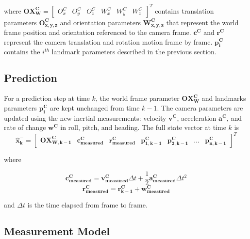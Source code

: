 \noindent where $\boldsymbol{OX_{W}^{C}}= \begin{bmatrix}O_{x}^{C} &
  O_{y}^{C} & O_{z}^{C} & W_{x}^{C} & W_{y}^{C} &
  W_{z}^{C} \end{bmatrix}^{T}$ contains translation parameters
$\boldsymbol{O_{x,y,z}^{C}}$ and orientation parameters
$\boldsymbol{W_{x,y,z}^{C}}$ that represent the world frame position and
orientation referenced to the camera frame.
$\boldsymbol{c^{C}}$ and $\boldsymbol{r^{C}}$ represent the camera
translation and rotation motion frame by frame. $\boldsymbol{p_{i}^{C}}$
contains the $i^{th}$ landmark parameters described in the previous section.

\subsection{Prediction}\label{sec:prediction}

For a prediction step at time $k$, the world frame parameter
$\boldsymbol{OX_W^C}$ and landmarks parameters $\boldsymbol{p_i^C}$
are kept unchanged from time $k-1$. The camera parameters are updated
using the new inertial measurements: velocity $\boldsymbol{v^{C}}$,
acceleration $\boldsymbol{a^{C}}$, and rate of change
$\boldsymbol{w^{C}}$ in roll, pitch, and heading. The full state
vector at time $k$ is
\begin{equation}
\boldsymbol{\hat{x}_{k}^-}
=\begin{bmatrix}
\boldsymbol{OX_{W,k-1}^{C}} & 
\boldsymbol{c_{measured}^{C}} &
\boldsymbol{r_{measured}^{C}} & 
\boldsymbol{p_{1,k-1}^{C}} & 
\boldsymbol{p_{2,k-1}^{C}} & 
\ldots & 
\boldsymbol{p_{n,k-1}^C}
\end{bmatrix}^T
\end{equation}

\noindent where 

\begin{equation}\boldsymbol{c_{measured}^{C}}=\boldsymbol{v_{measured}^{C}}\Delta t+ 
\frac{1}{2}\boldsymbol{a_{measured}^{C}}\Delta t^{2}\end{equation}
\begin{equation}\boldsymbol{r_{measured}^{C}}=\boldsymbol{r_{k-1}^{C}}+ \boldsymbol{w_{measured}^{C}}\end{equation}

\noindent and $\Delta t$ is the time elapsed from frame to frame. 

\subsection{Measurement Model}\label{sec:measurement_model}

